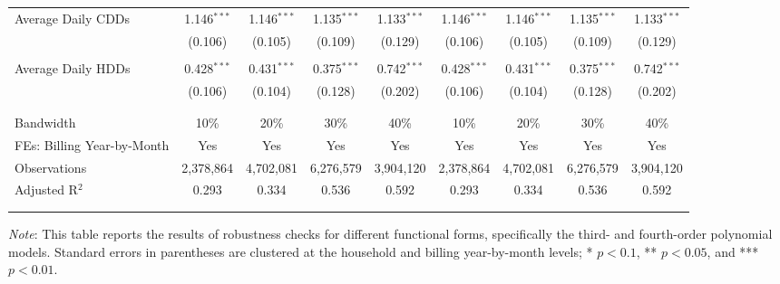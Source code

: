 {\begin{table}[t!]
\begin{adjustbox}{scale = 0.83}
\begin{threeparttable}
\begin{tabular}{@{\extracolsep{1pt}}lcccccccc}
                    Average Daily CDDs & 1.146$^{***}$ & 1.146$^{***}$ & 1.135$^{***}$ & 1.133$^{***}$ & 1.146$^{***}$ & 1.146$^{***}$ & 1.135$^{***}$ & 1.133$^{***}$ \\ 
                    & (0.106) & (0.105) & (0.109) & (0.129) & (0.106) & (0.105) & (0.109) & (0.129) \\ 
                    & & & & & & & & \\ 
                    Average Daily HDDs & 0.428$^{***}$ & 0.431$^{***}$ & 0.375$^{***}$ & 0.742$^{***}$ & 0.428$^{***}$ & 0.431$^{***}$ & 0.375$^{***}$ & 0.742$^{***}$ \\ 
                    & (0.106) & (0.104) & (0.128) & (0.202) & (0.106) & (0.104) & (0.128) & (0.202) \\ 
                    & & & & & & & & \\
                    \hline
                    \\[-2.0ex]
                    Bandwidth & 10\% & 20\% & 30\% & 40\% & 10\% & 20\% & 30\% & 40\% \\ 
                    FEs: Billing Year-by-Month & Yes & Yes & Yes & Yes & Yes & Yes & Yes & Yes \\ 
                    Observations & 2,378,864 & 4,702,081 & 6,276,579 & 3,904,120 & 2,378,864 & 4,702,081 & 6,276,579 & 3,904,120 \\ 
                    Adjusted R$^{2}$ & 0.293 & 0.334 & 0.536 & 0.592 & 0.293 & 0.334 & 0.536 & 0.592 \\
                    \\[-2.0ex]
                    \hline \hline
                    \\[-4.5ex]
                \end{tabular}
                \begin{tablenotes}[flushleft]
                    \footnotesize
                    \item \textit{Note}: This table reports the results of robustness checks for different functional forms, specifically the third- and fourth-order polynomial models. Standard errors in parentheses are clustered at the household and billing year-by-month levels; * $p < 0.1$, ** $p < 0.05$, and *** $p < 0.01$.
                \end{tablenotes}
            \end{threeparttable}
        \end{adjustbox}
        
    \end{table}
}
